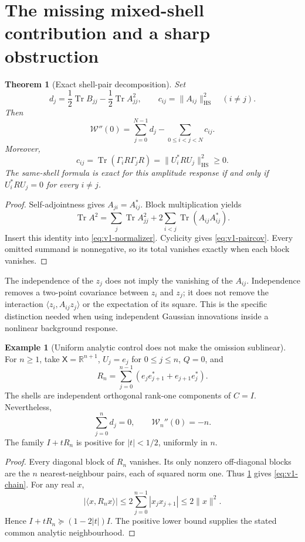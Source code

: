 \documentclass[11pt,a4paper]{article}
\newtheorem{theorem}{Theorem}[section]
\theoremstyle{definition}
\newtheorem{example}[example]{Example}
\theoremstyle{remark}
\DeclareMathOperator{\Tr}{Tr}
\newcommand{\R}{\mathbb R}
\newcommand{\ip}[2]{\langle #1,#2\rangle}
\newcommand{\norm}[1]{\lVert #1\rVert}
\newcommand{\HS}{\mathrm{HS}}
\begin{document}
\section{The missing mixed-shell contribution and a sharp obstruction}
\label{sec:v1-mixed}

\begin{theorem}[Exact shell-pair decomposition]
\label{thm:v1-mixed}
Set
\begin{equation}\label{eq:v1-diagonal}
 d_j=\frac12\Tr B_{jj}-\frac12\Tr A_{jj}^2,
 \qquad c_{ij}=\norm{A_{ij}}_\HS^2\quad(i\ne j).
\end{equation}
Then
\begin{equation}\label{eq:v1-mixed}
 \boxed{\displaystyle
 \mathcal W''(0)=\sum_{j=0}^{N-1}d_j
                      -\sum_{0\le i<j<N}c_{ij}.}
\end{equation}
Moreover,
\begin{equation}\label{eq:v1-paircov}
 c_{ij}=\Tr(\Gamma_iR\Gamma_jR)
       =\norm{U_i^*RU_j}_\HS^2\ge0.
\end{equation}
The same-shell formula is exact for this amplitude response if and only
if $U_i^*RU_j=0$ for every $i\ne j$.
\end{theorem}
\begin{proof}
Self-adjointness gives $A_{ji}=A_{ij}^*$. Block multiplication yields
\[
 \Tr A^2=\sum_j\Tr A_{jj}^2
               +2\sum_{i<j}\Tr(A_{ij}A_{ij}^*).
\]
Insert this identity into \cref{eq:v1-normalizer}. Cyclicity gives
\cref{eq:v1-paircov}. Every omitted summand is nonnegative, so its total
vanishes exactly when each block vanishes.
\end{proof}

The independence of the $z_j$ does not imply the vanishing of the
$A_{ij}$. Independence removes a two-point covariance between $z_i$ and
$z_j$; it does not remove the interaction
$\ip{z_i}{A_{ij}z_j}$ or the expectation of its square. This is the
specific distinction needed when using independent Gaussian innovations
inside a nonlinear background response.

\begin{example}[Uniform analytic control does not make the omission sublinear]
\label{ex:v1-chain}
For $n\ge1$, take $\mathsf X=\R^{n+1}$,
$U_j=e_j$ for $0\le j\le n$, $Q=0$, and
\[
 R_n=\sum_{j=0}^{n-1}(e_je_{j+1}^*+e_{j+1}e_j^*).
\]
The shells are independent orthogonal rank-one components of $C=I$.
Nevertheless,
\begin{equation}\label{eq:v1-chain}
 \sum_{j=0}^{n}d_j=0,\qquad
             \mathcal W_n''(0)=-n.
\end{equation}
The family $I+tR_n$ is positive for $|t|<1/2$, uniformly in $n$.
\end{example}
\begin{proof}
Every diagonal block of $R_n$ vanishes. Its only nonzero off-diagonal
blocks are the $n$ nearest-neighbour pairs, each of squared norm one.
Thus \cref{thm:v1-mixed} gives \cref{eq:v1-chain}. For any real $x$,
\[
 |\ip{x}{R_nx}|\le2\sum_{j=0}^{n-1}|x_jx_{j+1}|
       \le2\norm{x}^2.
\]
Hence $I+tR_n\succeq(1-2|t|)I$. The positive lower bound supplies the
stated common analytic neighbourhood.
\end{proof}
\end{document}
